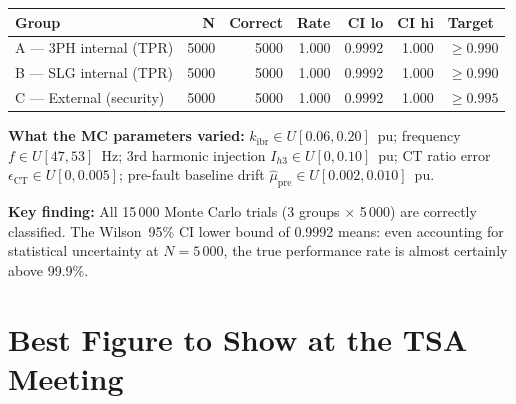 \documentclass[12pt,a4paper]{article}
\newcommand{\kibr}{k_\mathrm{ibr}}
\begin{document}
\begin{center}
\begin{tabular}{@{}lrrrrrl@{}}
\toprule
\textbf{Group} & \textbf{N} & \textbf{Correct} & \textbf{Rate} & \textbf{CI lo} & \textbf{CI hi} & \textbf{Target} \\
\midrule
A --- 3PH internal (TPR)    & 5000 & 5000 & 1.000 & 0.9992 & 1.000 & $\geq 0.990$ \\
B --- SLG internal (TPR)    & 5000 & 5000 & 1.000 & 0.9992 & 1.000 & $\geq 0.990$ \\
C --- External (security)   & 5000 & 5000 & 1.000 & 0.9992 & 1.000 & $\geq 0.995$ \\
\bottomrule
\end{tabular}
\end{center}

\textbf{What the MC parameters varied:}
$\kibr \in U[0.06, 0.20]$~pu; frequency $f \in U[47, 53]$~Hz; 3rd harmonic injection $I_{h3} \in U[0, 0.10]$~pu; CT ratio error $\epsilon_\mathrm{CT} \in U[0, 0.005]$; pre-fault baseline drift $\hat{\mu}_\mathrm{pre} \in U[0.002, 0.010]$~pu.

\textbf{Key finding:} All 15\,000 Monte Carlo trials (3 groups $\times$ 5\,000) are correctly classified. The Wilson~95\% CI lower bound of 0.9992 means: even accounting for statistical uncertainty at $N = 5\,000$, the true performance rate is almost certainly above 99.9\%.

\section{Best Figure to Show at the TSA Meeting}
\end{document}
